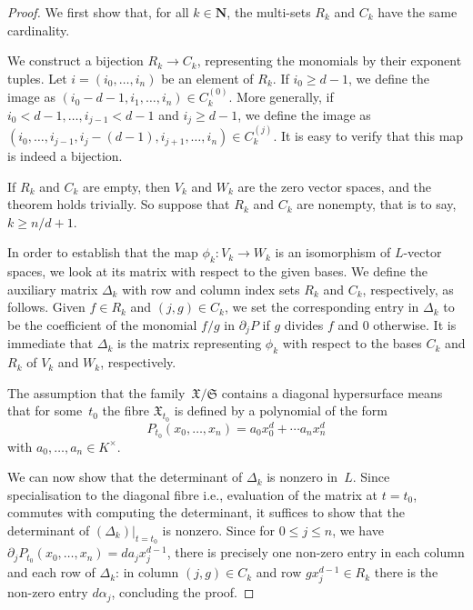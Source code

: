 \documentclass[a4paper,11pt]{article}
\numberwithin{equation}{section}
\newcommand{\NN}{\mathbf{N}} %
\renewcommand{\to}{\rightarrow}        %
\theoremstyle{definition}
\begin{document}
\begin{proof}
We first show that, for all $k \in \NN$, the multi-sets $R_k$ and $C_k$ 
have the same cardinality.

We construct a bijection $R_k \to C_k$, representing the 
monomials by their exponent tuples.  Let $i = (i_0, \dotsc, i_n)$ be an
element of $R_k$.  If $i_0 \geq d-1$, we define the image as
$(i_0-d-1, i_1, \dotsc, i_n) \in C_k^{(0)}$.  More generally, if 
$i_0 < d-1, \dotsc, i_{j-1} < d-1$ and $i_j \geq d-1$, we define the image as 
$(i_0, \dotsc, i_{j-1}, i_j-(d-1), i_{j+1}, \dotsc, i_n) \in C_k^{(j)}$.  
It is easy to verify that this map is indeed a bijection.

If $R_k$ and $C_k$ are empty, then $V_k$ and $W_k$ are the zero vector spaces, and
the theorem holds trivially. So suppose that $R_k$ and $C_k$ are nonempty, that is to
say, $k \geq n/d + 1$.

In order to establish that the map $\phi_k \colon V_k \to W_k$ is an 
isomorphism of $L$-vector spaces, we look at its matrix with respect to 
the given bases. We define the auxiliary matrix $\Delta_k$ with 
row and column index sets $R_k$ and $C_k$, respectively, as follows.  
Given $f \in R_k$ and $(j,g) \in C_k$, we set the corresponding entry in 
$\Delta_k$ to be the coefficient of the monomial $f/g$ in $\partial_j P$ if 
$g$ divides $f$ and $0$ otherwise.  It is immediate that $\Delta_k$ is the 
matrix representing $\phi_k$ with respect to the bases $C_k$ and $R_k$ of 
$V_k$ and $W_k$, respectively.

The assumption that the family~$\mathfrak{X}/\mathfrak{S}$ contains a diagonal 
hypersurface means that for some~$t_0$ the fibre $\mathfrak{X}_{t_0}$ is 
defined by a polynomial of the form 
\begin{equation}
P_{t_0}(x_0, \dotsc, x_n) = a_0 x_0^d + \dotsb a_n x_n^d
\end{equation}
with $a_0, \dotsc, a_n \in K^{\times}$.

We can now show that the determinant of $\Delta_k$ is nonzero in~$L$.  Since 
specialisation to the diagonal fibre i.e., evaluation of the matrix at 
$t = t_0$, commutes with computing the determinant, it suffices to show that 
the determinant of $(\Delta_k) \big |_{t=t_0}$ is nonzero.
Since for $0 \leq j \leq n$, we have $\partial_j P_{t_0} (x_0, \dotsc, x_n) = d a_j x_j^{d-1}$, 
there is precisely one non-zero entry in each column and each row of $\Delta_k$:  in column 
$(j, g) \in C_k$ and row $g x_j^{d-1} \in R_k$ there is the non-zero entry 
$d \alpha_j$, concluding the proof.
\end{proof}
\end{document}
